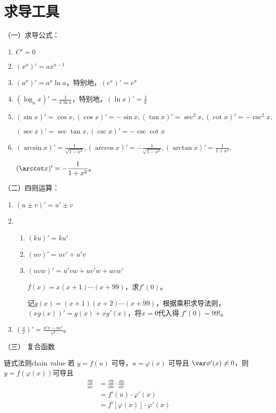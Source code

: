     \section{求导工具}
    （一）求导公式：
    \begin{enumerate}
        \item $C'=0$
        \item $(x^a)'=ax^{a-1}$
        \item $(a^x)'=a^x\ln a$，特别地，$(e^x)'=e^x$
        \item $(\log_a x)'=\displaystyle\frac{1}{x\ln a}$，特别地，$(\ln x)'=\displaystyle\frac{1}{x}$
        \item $(\sin x)'=\cos x,(\cos x)'=-\sin x,(\tan x)'=\sec ^2 x,(\cot x)'= - \csc^2 x,$
        
        $(\sec x)'=\sec\tan x,(\csc x)' = -\csc\cot x$
        \item $(\arcsin x)' = \displaystyle\frac{1}{\sqrt{1-x^2}},(\arccos x)' = -\displaystyle\frac{1}{\sqrt{1-x^2}},(\arctan x)' = \displaystyle\frac{1}{1+x^2}$,
        
        $(\arccot x)' = -\displaystyle\frac{1}{1+x^2}$。
    \end{enumerate}

    （二）四则运算：
    \begin{enumerate}
        \item $(u\pm v)'=u'\pm v$
        \item 
        \begin{enumerate}
            \item $(ku)'=ku'$
            \item $(uv)'=uv'+u'v$
            \item $(uvw)'=u'vw+uv'w+uvw'$
            \begin{example}
                $f(x) = x(x+1) \cdots (x+99)$，求$f'(0)$。
            \end{example}
            \begin{solution}
                记$g(x) = (x+1)(x+2)\cdots(x+99)$，根据乘积求导法则，$(xg(x))' = g(x)+xg'(x)$，将$x=0$代入得 $f'(0)=99!$。
            \end{solution}
        \end{enumerate}
        \item $(\displaystyle\frac{u}{v})' = \displaystyle\frac{u'v-uv'}{v^2}$。
    \end{enumerate}

    （三） 复合函数
    \begin{theorem}{链式法则}{chain value}
        若 $y = f(u)$ 可导，$u = \varphi(x)$ 可导且 $\var\phi'(x)\neq 0$，则 $y=f(\varphi(x))$可导且
        \begin{align*}
            \frac{\dd{y}}{\dd{x}} &= \frac{\dd{y}}{\dd{u}}\cdot \frac{\dd{u}}{\dd{x}}\\
            &=f'(u) \cdot \varphi'(x)\\
            &=f'[\varphi(x)]\cdot \varphi'(x)
        \end{align*}
    \end{theorem}

